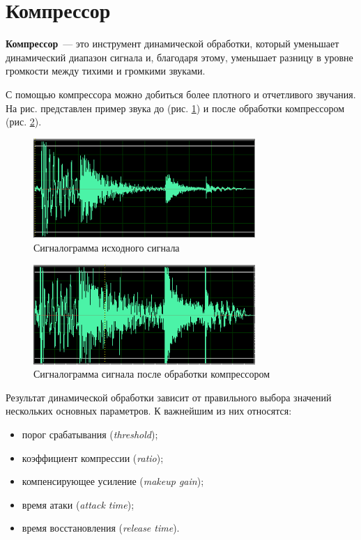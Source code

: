 \documentclass[oneside, final, 14pt]{extreport}
\begin{document}
\section{Компрессор}
\textbf{Компрессор}~--- это инструмент динамической обработки, который уменьшает динамический диапазон сигнала и, благодаря этому, уменьшает разницу в уровне громкости между тихими и громкими звуками.

С помощью компрессора можно добиться более плотного и отчетливого звучания. На рис. представлен пример звука до (рис. \ref{pic-example-01}) и после обработки компрессором (рис. \ref{pic-example-02}).

\begin{figure}[h!]
  \centering
  \includegraphics[width=0.75\textwidth]{pic-example-01}
  \caption{Сигналограмма исходного сигнала}
  \label{pic-example-01}
\end{figure}

\begin{figure}[h!]
  \centering
  \includegraphics[width=0.75\textwidth]{pic-example-02}
  \caption{Сигналограмма сигнала после обработки компрессором}
  \label{pic-example-02}
\end{figure}

Результат динамической обработки зависит от правильного выбора значений нескольких основных параметров. К важнейшим из них относятся:
\begin{itemize}
  \item порог срабатывания (\emph{threshold});
  \item коэффициент компрессии (\emph{ratio});
  \item компенсирующее усиление (\emph{makeup gain});
  \item время атаки (\emph{attack time});
  \item время восстановления (\emph{release time}).
\end{itemize}
\end{document}
